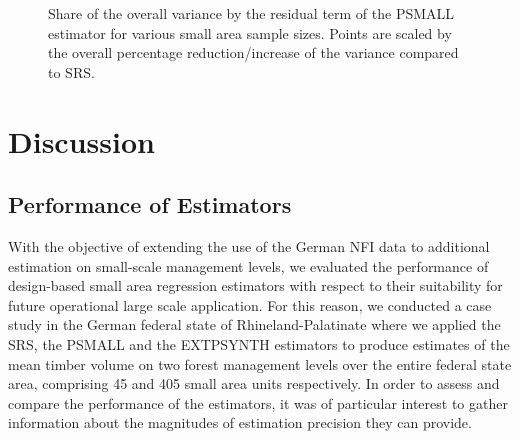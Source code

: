 \documentclass[remotesensing,article,accept,moreauthors,pdftex,10pt,a4paper]{Definitions/mdpi}
\newcommand{\psmall}{PSMALL}
\newcommand{\extpsynth}{EXTPSYNTH}
\begin{document}
\begin{figure}[H]
	\centering
	\caption{Share of the overall variance by the residual term of the \psmall{} estimator for various small area sample sizes. Points are scaled by the overall percentage reduction/increase of the variance compared to SRS.}
	\label{fig:fail}
\end{figure}



\section{Discussion}
\label{sec:Dis}
\vspace{-6pt}
\subsection{Performance of Estimators}

With the objective of extending the use of the German NFI data to additional estimation on small-scale management levels, we evaluated the performance of design-based small area regression estimators with respect to their suitability for future operational large scale application. For this reason, we conducted a case study in the German federal state of Rhineland-Palatinate where we applied the SRS, the \psmall{} and the \extpsynth{} estimators to produce estimates of the mean timber volume on two forest management levels over the entire federal state area, comprising 45 and 405 small area units respectively. In order to assess and compare the performance of the estimators, it was of particular interest to gather information about the magnitudes of estimation precision they can provide.\par
\end{document}
